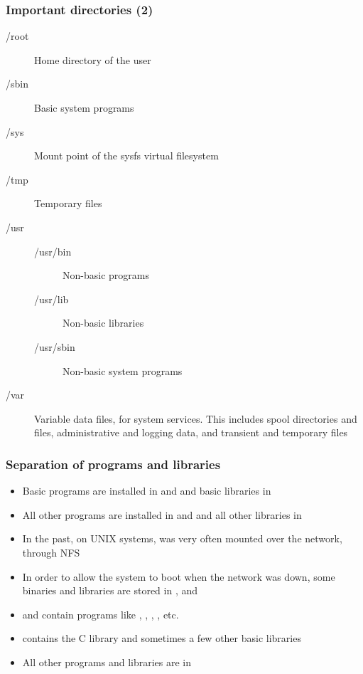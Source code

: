 \begin{frame}
  \frametitle{Important directories (2)}
  \begin{description}
  \item[/root]Home directory of the  user
  \item[/sbin]Basic system programs
  \item[/sys]Mount point of the sysfs virtual filesystem
  \item[/tmp]Temporary files
  \item[/usr]
    \begin{description}
    \item[/usr/bin]Non-basic programs
    \item[/usr/lib]Non-basic libraries
    \item[/usr/sbin]Non-basic system programs
    \end{description}
  \item[/var] Variable data files, for system services. This includes spool directories and
    files, administrative and logging data, and transient and
    temporary files
  \end{description}
\end{frame}

\begin{frame}
  \frametitle{Separation of programs and libraries}
  \begin{itemize}
  \item Basic programs are installed in  and 
    and basic libraries in 
  \item All other programs are installed in  and
     and all other libraries in 
  \item In the past, on UNIX systems,  was very often
    mounted over the network, through NFS
  \item In order to allow the system to boot when the network was
    down, some binaries and libraries are stored in ,
     and 
  \item {} and  contain programs like ,
    , , , etc.
  \item {} contains the C library and sometimes a few other
    basic libraries
  \item All other programs and libraries are in 
  \end{itemize}
\end{frame}
